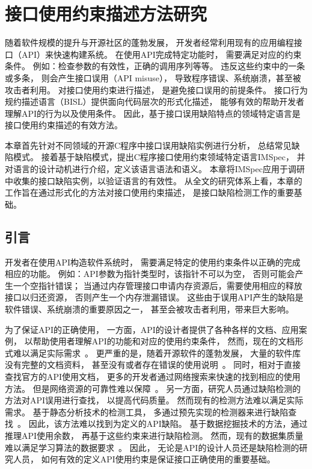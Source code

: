 \chapter{接口使用约束描述方法研究}
\label{cha:impsec}
随着软件规模的提升与开源社区的蓬勃发展，
开发者经常利用现有的应用编程接口（API）来快速构建系统。
在使用API完成特定功能时，
需要满足对应的约束条件。
例如：检查参数的有效性，正确的调用序列等等。
违反这些约束中的一条或多条，
则会产生接口误用（API misuse），
导致程序错误、系统崩溃，甚至被攻击者利用。
对接口使用约束进行描述，
是避免接口误用的前提条件。
接口行为规约描述语言（BISL）提供面向代码层次的形式化描述，
能够有效的帮助开发者理解API的行为以及使用条件。
因此，基于接口误用缺陷特点的领域特定语言是接口使用约束描述的有效方法。


本章首先针对不同领域的开源C程序中接口误用缺陷实例进行分析，
总结常见缺陷模式。
接着基于缺陷模式，提出C程序接口使用约束领域特定语言IMSpec，
并对语言的设计动机进行介绍，定义该语言语法和语义。
本章将IMSpec应用于调研中收集的接口缺陷实例，以验证语言的有效性。
从全文的研究体系上看，本章的工作旨在通过形式化的方法对接口使用约束描述，
是接口缺陷检测工作的重要基础。


\section{引言}
开发者在使用API构造软件系统时，
需要满足特定的使用约束条件以正确的完成相应的功能。
例如：API参数为指针类型时，该指针不可以为空，
否则可能会产生一个空指针错误；
当通过内存管理接口申请内存资源后，需要使用相应的释放接口以归还资源，
否则产生一个内存泄漏错误。
这些由于误用API产生的缺陷是软件错误、系统崩溃的重要原因之一，
甚至会被攻击者利用，带来巨大影响。


为了保证API的正确使用，
一方面，API的设计者提供了各种各样的文档、应用案例，
以帮助使用者理解API的功能和对应的使用约束条件，
然而，现在的文档形式难以满足实际需求~\cite{09-icse-doc}。
更严重的是，随着开源软件的蓬勃发展，
大量的软件库没有完整的文档资料，
甚至没有或者存在错误的使用说明~\cite{15-ieee-doc-fail, 17-icse-api-doc}。
同时，相对于直接查找官方的API使用文档，
更多的开发者通过网络搜索来快速的找到相应的使用方法。
但是网络资源的可靠性难以保障~\cite{18-icse-stack}。
另一方面，研究人员通过缺陷检测的方法对API误用进行查找，
以提高代码质量。
然而现有的检测方法难以满足实际需求。
基于静态分析技术的检测工具，
多通过预先实现的检测器来进行缺陷查找~\cite{15-coufless-static-survey}。
因此，该方法难以找到为定义的API缺陷。
基于数据挖掘技术的方法，通过推理API使用余数，
再基于这些约束来进行缺陷检测。
然而，现有的数据集质量难以满足学习算法的数据要求~\cite{survey18}。
因此，
无论是API的设计人员还是缺陷检测的研究人员，
如何有效的定义API使用约束是保证接口正确使用的重要基础。

